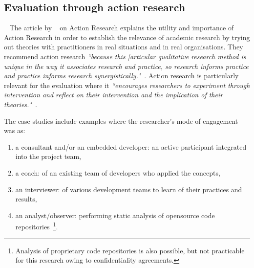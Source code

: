 \subsection{Evaluation through action research}~\label{section-evaluation-through-action-research-method}
The article by ~\citet*{avison1999_action_research} on Action Research explains the utility and importance of Action Research in order to establish the relevance of academic research by trying out theories with practitioners in real situations and in real organisations. They recommend action research \emph{``because this [articular qualitative research method is unique in the way it associates research and practice, so research informs practice and practice informs research synergistically."}~\citep[p.94]{avison1999_action_research}. Action research is particularly relevant for the evaluation where it \emph{``encourages researchers to experiment through intervention and reflect on their intervention and the implication of their theories."}~\citep[p.95]{avison1999_action_research}. 

The case studies include examples where the researcher's mode of engagement was as:
\begin{enumerate}
    \itemsep0em
    \item a consultant and/or an embedded developer: an active participant integrated into the project team,
    \item a coach: of an existing team of developers who applied the concepts,
    \item an interviewer: of various development teams to learn of their practices and results,
    \item an analyst/observer: performing static analysis of opensource code repositories~\footnote{Analysis of proprietary code repositories is also possible, but not practicable for this research owing to confidentiality agreements.}.
\end{enumerate}


